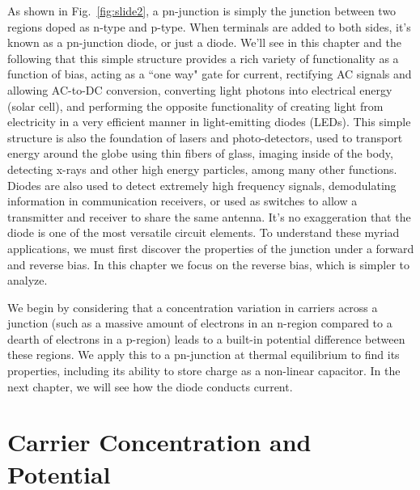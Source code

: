 As shown in Fig.~\ref{fig:slide2}, a pn-junction is simply the junction between two regions doped as n-type and p-type.  When terminals are added to both sides, it's known as a pn-junction diode, or just a diode.  We'll see in this chapter and the following that this simple structure provides a rich variety of functionality as a function of bias, acting as a ``one way" gate for current, rectifying AC signals and allowing AC-to-DC conversion, converting light photons into electrical energy (solar cell), and performing the opposite functionality of creating light from electricity in a very efficient manner in light-emitting diodes (LEDs).  This simple structure is also the foundation of lasers and photo-detectors, used to transport energy around the globe using thin fibers of glass, imaging inside of the body, detecting x-rays and other high energy particles, among many other functions.   Diodes are also used to detect extremely high frequency signals, demodulating information in communication receivers, or used as switches to allow a transmitter and receiver to share the same antenna.  It's no exaggeration that the diode is one of the most versatile circuit elements.  To understand these myriad applications, we must first discover the properties of the junction under a forward and reverse bias.  In this chapter we focus on the reverse bias, which is simpler to analyze.

We begin by considering that a concentration variation in carriers across a junction (such as a massive amount of electrons in an n-region compared to a dearth of electrons in a p-region) leads to a built-in potential difference between these regions.  We apply this to a pn-junction at thermal equilibrium to find its properties, including its ability to store charge as a non-linear capacitor.  In the next chapter, we will see how the diode conducts current.

 
 
\section{Carrier Concentration and Potential}


